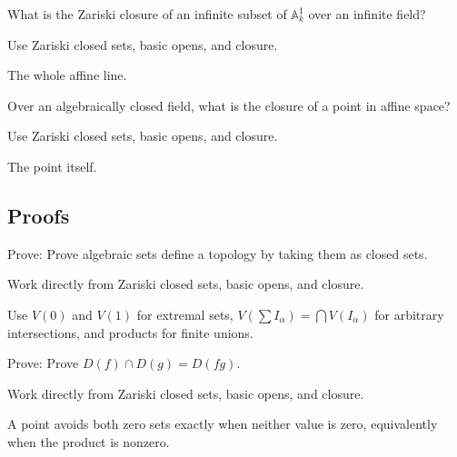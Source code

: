 \begin{exercise}\label{exr:vi02-expand-04}
What is the Zariski closure of an infinite subset of $\mathbb A^1_k$ over an infinite field?
\end{exercise}
\begin{hint}
Use Zariski closed sets, basic opens, and closure.
\end{hint}
\begin{solution}
The whole affine line.
\end{solution}

\begin{exercise}\label{exr:vi02-expand-05}
Over an algebraically closed field, what is the closure of a point in affine space?
\end{exercise}
\begin{hint}
Use Zariski closed sets, basic opens, and closure.
\end{hint}
\begin{solution}
The point itself.
\end{solution}

\subsection*{Proofs}

\begin{exercise}\label{exr:vi02-expand-06}
Prove: Prove algebraic sets define a topology by taking them as closed sets.
\end{exercise}
\begin{hint}
Work directly from Zariski closed sets, basic opens, and closure.
\end{hint}
\begin{solution}
Use $V(0)$ and $V(1)$ for extremal sets, $V(\sum I_\alpha)=\bigcap V(I_\alpha)$ for arbitrary intersections, and products for finite unions.
\end{solution}

\begin{exercise}\label{exr:vi02-expand-07}
Prove: Prove $D(f)\cap D(g)=D(fg)$.
\end{exercise}
\begin{hint}
Work directly from Zariski closed sets, basic opens, and closure.
\end{hint}
\begin{solution}
A point avoids both zero sets exactly when neither value is zero, equivalently when the product is nonzero.
\end{solution}

